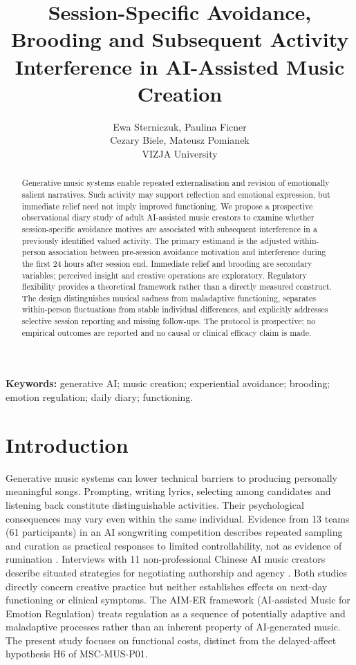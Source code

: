 \documentclass[11pt]{article}
\title{Session-Specific Avoidance, Brooding and Subsequent Activity Interference in AI-Assisted Music Creation}
\author{Ewa Sterniczuk, Paulina Ficner\\Cezary Biele, Mateusz Pomianek\\[0.4em]\small VIZJA University}
\begin{document}
\maketitle
\begin{abstract}
Generative music systems enable repeated externalisation and revision of emotionally salient narratives. Such activity may support reflection and emotional expression, but immediate relief need not imply improved functioning. We propose a prospective observational diary study of adult AI-assisted music creators to examine whether session-specific avoidance motives are associated with subsequent interference in a previously identified valued activity. The primary estimand is the adjusted within-person association between pre-session avoidance motivation and interference during the first 24 hours after session end. Immediate relief and brooding are secondary variables; perceived insight and creative operations are exploratory. Regulatory flexibility provides a theoretical framework rather than a directly measured construct. The design distinguishes musical sadness from maladaptive functioning, separates within-person fluctuations from stable individual differences, and explicitly addresses selective session reporting and missing follow-ups. The protocol is prospective; no empirical outcomes are reported and no causal or clinical efficacy claim is made.
\end{abstract}
\noindent\textbf{Keywords:} generative AI; music creation; experiential avoidance; brooding; emotion regulation; daily diary; functioning.
\section{Introduction}
Generative music systems can lower technical barriers to producing personally meaningful songs. Prompting, writing lyrics, selecting among candidates and listening back constitute distinguishable activities. Their psychological consequences may vary even within the same individual. Evidence from 13 teams (61 participants) in an AI songwriting competition describes repeated sampling and curation as practical responses to limited controllability, not as evidence of rumination \citep{huang2020}. Interviews with 11 non-professional Chinese AI music creators describe situated strategies for negotiating authorship and agency \citep{zhao2026}. Both studies directly concern creative practice but neither establishes effects on next-day functioning or clinical symptoms. The AIM-ER framework (AI-assisted Music for Emotion Regulation) treats regulation as a sequence of potentially adaptive and maladaptive processes rather than an inherent property of AI-generated music. The present study focuses on functional costs, distinct from the delayed-affect hypothesis H6 of MSC-MUS-P01.
\end{document}
